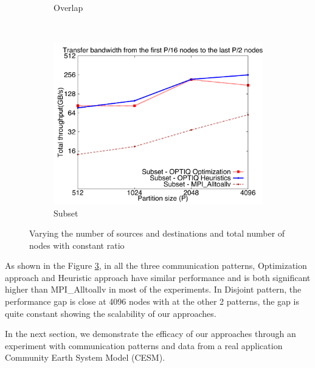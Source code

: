 \begin{figure}[!htbp]
\begin{subfigure}[b]{0.32\textwidth}
                \caption{Overlap}
                \label{fig:constantr_overlap_msg}
        \end{subfigure}
        ~ %
        \begin{subfigure}[b]{0.32\textwidth}
                \includegraphics[width=\textwidth]{figures/constantr_subset_msg.pdf}
                \caption{Subset}
                \label{fig:constantr_subset_msg}
        \end{subfigure}
        \caption{Varying the number of sources and destinations and total number of nodes with constant ratio}
        \label{fig:constantr_msg}
\end{figure}

As shown in the Figure \ref{fig:constantr_msg}, in all the three communication patterns, Optimization approach and Heuristic approach have similar performance and is both significant higher than MPI\_Alltoallv in most of the experiments. In Disjoint pattern, the performance gap is close at 4096 nodes with at the other 2 patterns, the gap is quite constant showing the scalability of our approaches.

In the next section, we demonstrate the efficacy of our approaches through an experiment with communication patterns and data from a real application Community Earth System Model (CESM).
